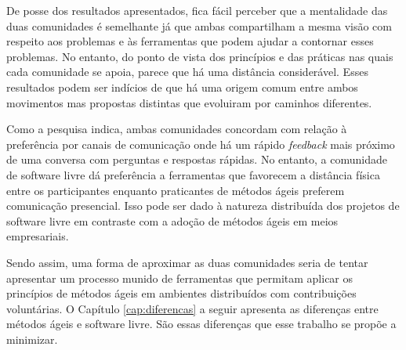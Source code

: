 De posse dos resultados apresentados, fica fácil perceber que a
mentalidade das duas comunidades é semelhante já que ambas
compartilham a mesma visão com respeito aos problemas e às ferramentas
que podem ajudar a contornar esses problemas. No entanto, do ponto de
vista dos princípios e das práticas nas quais cada comunidade se
apoia, parece que há uma distância considerável. Esses resultados
podem ser indícios de que há uma origem comum entre ambos movimentos
mas propostas distintas que evoluiram por caminhos diferentes.

Como a pesquisa indica, ambas comunidades concordam com relação à
preferência por canais de comunicação onde há um rápido
\textit{feedback} mais próximo de uma conversa com perguntas e
respostas rápidas. No entanto, a comunidade de software livre dá
preferência a ferramentas que favorecem a distância física entre os
participantes enquanto praticantes de métodos ágeis preferem
comunicação presencial. Isso pode ser dado à natureza distribuída dos
projetos de software livre em contraste com a adoção de
métodos ágeis em meios empresariais.

Sendo assim, uma forma de aproximar as duas comunidades seria de
tentar apresentar um processo munido de ferramentas que permitam
aplicar os princípios de métodos ágeis em ambientes distribuídos com
contribuições voluntárias. O Capítulo \ref{cap:diferencas} a seguir
apresenta as diferenças entre métodos ágeis e software livre. São
essas diferenças que esse trabalho se propõe a minimizar.

